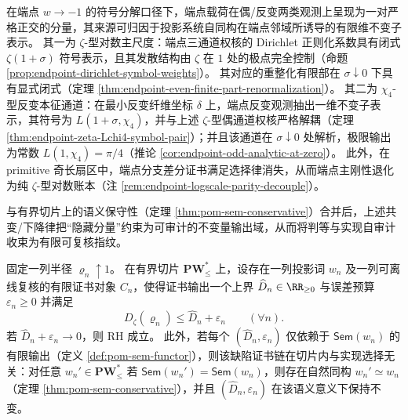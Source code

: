 \begin{remark}\label{rem:endpoint-obstruction-dichotomy}
在端点 \(w\to-1\) 的符号分解口径下，端点载荷在偶/反变两类观测上呈现为一对严格正交的分量，其来源可归因于投影系统自同构在端点邻域所诱导的有限维不变子表示。
其一为 \(\zeta\)-型对数主尺度：端点三通道权核的 Dirichlet 正则化系数具有闭式 \(\zeta(1+\sigma)\) 符号表示，且其发散结构由 \(\zeta\) 在 \(1\) 处的极点完全控制（命题 \ref{prop:endpoint-dirichlet-symbol-weights}）。
其对应的重整化有限部在 \(\sigma\downarrow 0\) 下具有显式闭式（定理 \ref{thm:endpoint-even-finite-part-renormalization}）。
其二为 \(\chi_4\)-型反变本征通道：在最小反变纤维坐标 \(\delta\) 上，端点反变观测抽出一维不变子表示，其符号为 \(L(1+\sigma,\chi_4)\)，并与上述 \(\zeta\)-型偶通道权核严格解耦（定理 \ref{thm:endpoint-zeta-Lchi4-symbol-pair}）；并且该通道在 \(\sigma\downarrow 0\) 处解析，极限输出为常数 \(L(1,\chi_4)=\pi/4\)（推论 \ref{cor:endpoint-odd-analytic-at-zero}）。
此外，在 primitive 奇长扇区中，端点分支差分证书满足选择律消失，从而端点主刚性退化为纯 \(\zeta\)-型对数账本（注 \ref{rem:endpoint-logscale-parity-decouple}）。
\end{remark}
与有界切片上的语义保守性（定理 \ref{thm:pom-sem-conservative}）合并后，上述共变/下降律把“隐藏分量”约束为可审计的不变量输出域，从而将判等与实现自审计收束为有限可复核指纹。

\begin{theorem}\label{thm:dephys-impl-independent-defect-certificate}
固定一列半径 \(\varrho_n\uparrow 1\)。
在有界切片 \(\mathbf{PW}^{\ast}_{\le}\) 上，设存在一列投影词 \(w_n\) 及一列可离线复核的有限证书对象 \(C_n\)，使得证书输出一个上界 \(\widehat D_n\in\RR_{\ge 0}\) 与误差预算 \(\varepsilon_n\ge 0\) 并满足
\begin{equation}\label{eq:dephys-defect-certificate-soundness}
D_{\zeta}(\varrho_n)\le \widehat D_n+\varepsilon_n\qquad(\forall n).
\end{equation}
若 \(\widehat D_n+\varepsilon_n\to 0\)，则 RH 成立。
此外，若每个 \((\widehat D_n,\varepsilon_n)\) 仅依赖于 \(\mathsf{Sem}(w_n)\) 的有限输出（定义 \ref{def:pom-sem-functor}），则该缺陷证书链在切片内与实现选择无关：对任意 \(w_n'\in\mathbf{PW}^{\ast}_{\le}\) 若 \(\mathsf{Sem}(w_n')=\mathsf{Sem}(w_n)\)，则存在自然同构 \(w_n'\simeq w_n\)（定理 \ref{thm:pom-sem-conservative}），并且 \((\widehat D_n,\varepsilon_n)\) 在该语义意义下保持不变。
\end{theorem}

